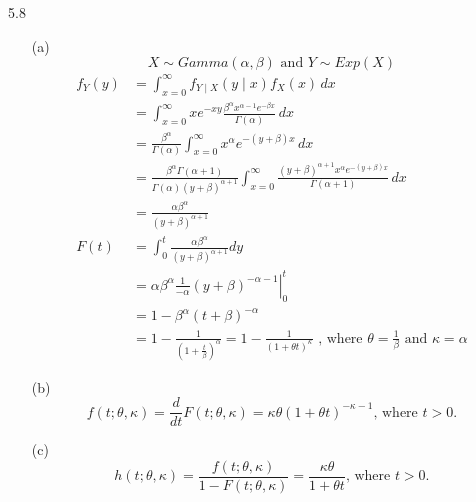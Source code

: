 \documentclass[paper=a4, fontsize=12pt]{scrartcl} %
\numberwithin{equation}{section} %
\numberwithin{figure}{section} %
\numberwithin{table}{section} %
\begin{document}
\newpage
5.8
\begin{itemize}
	\item[(a)]	$$X \sim Gamma(\alpha,\beta) \text{\ and\ } Y \sim Exp(X)$$
			\begin{align*} f_Y(y) &= \int_{x=0}^\infty f_{Y \mid X}(y \mid x) f_X(x) \, dx \\ &= \int_{x=0}^\infty x e^{-x y} \frac{\beta^\alpha x^{\alpha-1} e^{-\beta x}}{\Gamma(\alpha)} \, dx \\ &= \frac{\beta^\alpha}{\Gamma(\alpha)} \int_{x=0}^\infty x^{\alpha} e^{-(y+\beta)x} \, dx \\ &= \frac{\beta^\alpha \Gamma(\alpha+1)}{\Gamma(\alpha)(y+\beta)^{\alpha+1}} \int_{x=0}^\infty \frac{(y+\beta)^{\alpha+1} x^{\alpha} e^{-(y+\beta)x}}{\Gamma(\alpha+1)} \, dx \\ &= \frac{\alpha\beta^\alpha}{(y + \beta)^{\alpha+1}}  \\ F(t) &= \int_0^t \frac{\alpha\beta^\alpha}{(y + \beta)^{\alpha+1}} dy\\ &= \left. \alpha\beta^\alpha \frac{1}{-\alpha}\left( y+\beta \right)^{-\alpha -1} \right|_0^t \\ &= 1-\beta^\alpha \left( t+\beta \right)^{-\alpha} \\ &= 1- \frac{1}{\left( 1+ \frac{t}{\beta}\right)^{\alpha}} = 1- \frac{1}{\left(1+\theta t \right)^\kappa} \text{\ , where\ } \theta = \frac{1}{\beta} \text{\ and \ } \kappa = \alpha\end{align*}
			
	\item[(b)]	$$f(t; \theta, \kappa) = \frac{d}{dt} F(t; \theta, \kappa) = \kappa \theta \left( 1+\theta t \right)^{-\kappa-1} \text{, where } t>0.$$
	
	\item[(c)]	$$h(t; \theta, \kappa) = \frac{f(t; \theta, \kappa)}{1-F(t; \theta, \kappa)} = \frac{\kappa\theta}{1+\theta t}\text{, where } t>0.$$
\end{itemize}
\end{document}
